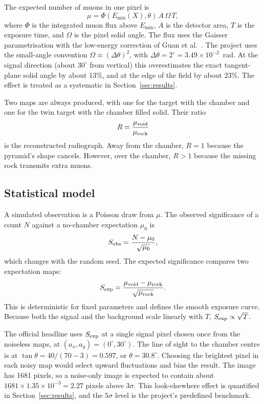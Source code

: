 \documentclass{article}
\begin{document}
The expected number of muons in one pixel is
\begin{equation}
\mu=\Phi(E_{\min}(X),\theta)\,A\,\Omega\,T,
\label{eq:counts}
\end{equation}
where $\Phi$ is the integrated muon flux above $E_{\min}$, $A$ is the detector
area, $T$ is the exposure time, and $\Omega$ is the pixel solid angle. The flux
uses the Gaisser parametrisation \cite{gaisser1990} with the low-energy
correction of Guan et al.\ \cite{guan2015}. The project uses the small-angle
convention $\Omega\approx(\Delta\theta)^2$, with
$\Delta\theta=2^\circ=3.49\times10^{-2}$~rad. At the signal direction (about
$30^\circ$ from vertical) this overestimates the exact tangent-plane solid
angle by about 13\%, and at the edge of the field by about 23\%. The effect is
treated as a systematic in Section~\ref{sec:results}.

Two maps are always produced, with one for the target with the chamber and one for
the twin target with the chamber filled solid. Their ratio
\begin{equation}
R=\frac{\mu_{\rm void}}{\mu_{\rm rock}}
\label{eq:ratio}
\end{equation}
is the reconstructed radiograph. Away from the chamber, $R=1$ because the
pyramid's shape cancels. However, over the chamber, $R>1$ because the missing rock
transmits extra muons.

\subsection{Statistical model}

A simulated observation is a Poisson draw from $\mu$. The observed significance
of a count $N$ against a no-chamber expectation $\mu_0$ is
\begin{equation}
S_{\rm obs}=\frac{N-\mu_0}{\sqrt{\mu_0}},
\label{eq:sobs}
\end{equation}
which changes with the random seed. The expected significance compares two
expectation maps:
\begin{equation}
S_{\rm exp}=\frac{\mu_{\rm void}-\mu_{\rm rock}}{\sqrt{\mu_{\rm rock}}}.
\label{eq:sexp}
\end{equation}
This is deterministic for fixed parameters and defines the smooth exposure
curve. Because both the signal and the background scale linearly with $T$,
$S_{\rm exp}\propto\sqrt{T}$.

The official headline uses $S_{\rm exp}$ at a single signal pixel chosen once
from the noiseless maps, at $(a_x,a_y)=(0^\circ,30^\circ)$. The line of sight
to the chamber centre is at
$\tan\theta=40/(70-3)=0.597$, or $\theta=30.8^\circ$. Choosing the brightest
pixel in each noisy map would select upward fluctuations and bias the result.
The image has 1681 pixels, so a noise-only image is expected to contain about
$1681\times1.35\times10^{-3}=2.27$ pixels above $3\sigma$. This look-elsewhere
effect is quantified in Section~\ref{sec:results}, and the $5\sigma$ level is the
project's predefined benchmark.
\end{document}
